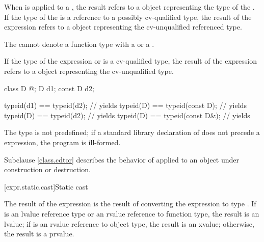 \pnum
When  is applied to a , the result
refers to a  object representing the type of the
. If the type of the  is a reference
to a possibly cv-qualified type, the result of the
 expression refers to a  object
representing the cv-unqualified referenced type.
\begin{note}
The  cannot denote a function type with
a  or a .
\end{note}

\pnum
If the type of the expression or  is a
cv-qualified type, the result of the  expression refers
to a  object representing the cv-unqualified
type.
\begin{example}
\begin{codeblock}
class D { @\commentellip@ };
D d1;
const D d2;

typeid(d1) == typeid(d2);       // yields 
typeid(D)  == typeid(const D);  // yields 
typeid(D)  == typeid(d2);       // yields 
typeid(D)  == typeid(const D&); // yields 
\end{codeblock}
\end{example}

\pnum
The type  is not predefined;
if a standard library declaration of
 does not precede
a  expression, the program is ill-formed.

\pnum
\begin{note}
Subclause \ref{class.cdtor} describes the behavior of 
applied to an object under construction or destruction.
\end{note}

[expr.static.cast]{Static cast}

\pnum
{}%
%
The result of the expression  is the result of
converting the expression  to type .
%
%
If  is an lvalue reference type
or an rvalue reference to function type, the result is an lvalue;
if  is an rvalue reference to object type, the result is an xvalue;
otherwise, the result is a prvalue.

